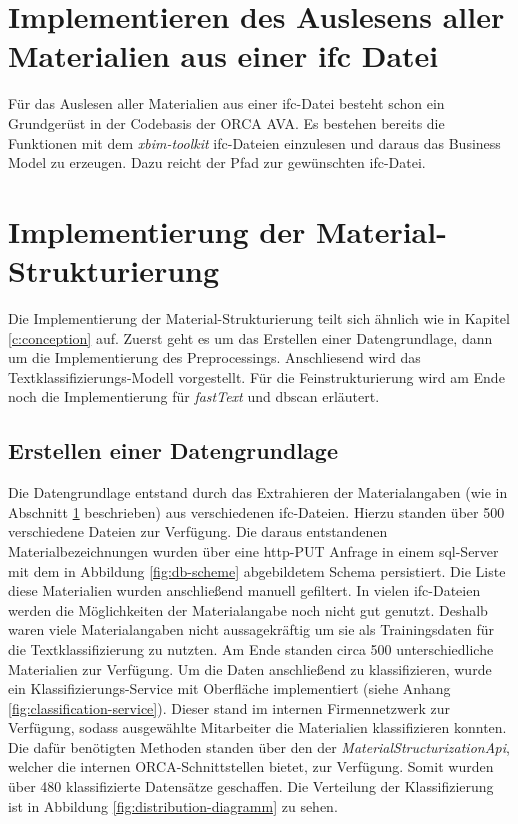 \section{Implementieren des Auslesens aller Materialien aus einer \ac{ifc} Datei}
\label{c:implementation:ifc-material-extraction}
Für das Auslesen aller Materialien aus einer \ac{ifc}-Datei besteht schon ein Grundgerüst in der Codebasis der ORCA AVA. Es bestehen bereits die Funktionen mit dem \textit{xbim-toolkit} \ac{ifc}-Dateien einzulesen und daraus das Business Model  zu erzeugen. Dazu reicht der Pfad zur gewünschten \ac{ifc}-Datei. 

\section{Implementierung der Material-Strukturierung}
\label{c:implementation:structuring}
Die Implementierung der Material-Strukturierung teilt sich ähnlich wie in Kapitel \ref{c:conception} auf. Zuerst geht es um das Erstellen einer Datengrundlage, dann um die Implementierung des Preprocessings. Anschliesend wird das Textklassifizierungs-Modell vorgestellt. Für die Feinstrukturierung wird am Ende noch die Implementierung für \textit{fastText} und \ac{dbscan} erläutert.
\subsection{Erstellen einer Datengrundlage}
\label{c:implementation:data} 
Die Datengrundlage entstand durch das Extrahieren der Materialangaben (wie in Abschnitt \ref{c:implementation:ifc-material-extraction} beschrieben) aus verschiedenen \ac{ifc}-Dateien. Hierzu standen über 500 verschiedene Dateien zur Verfügung. Die daraus entstandenen Materialbezeichnungen wurden über eine \ac{http}-PUT Anfrage in einem \ac{sql}-Server mit dem in Abbildung \ref{fig:db-scheme} abgebildetem Schema persistiert. Die Liste diese Materialien wurden anschließend manuell gefiltert. In vielen \ac{ifc}-Dateien werden die Möglichkeiten der Materialangabe noch nicht gut genutzt. Deshalb waren viele Materialangaben nicht aussagekräftig um sie als Trainingsdaten für die Textklassifizierung zu nutzten. Am Ende standen circa 500 unterschiedliche Materialien zur Verfügung.
Um die Daten anschließend zu klassifizieren, wurde ein Klassifizierungs-Service mit Oberfläche implementiert (siehe Anhang \ref{fig:classification-service}). Dieser stand im internen Firmennetzwerk zur Verfügung, sodass ausgewählte Mitarbeiter die Materialien klassifizieren konnten. Die dafür benötigten Methoden standen über den  der \textit{MaterialStructurizationApi}, welcher die internen ORCA-Schnittstellen bietet, zur Verfügung. Somit wurden über 480 klassifizierte Datensätze geschaffen. Die Verteilung der Klassifizierung ist in Abbildung \ref{fig:distribution-diagramm} zu sehen.
